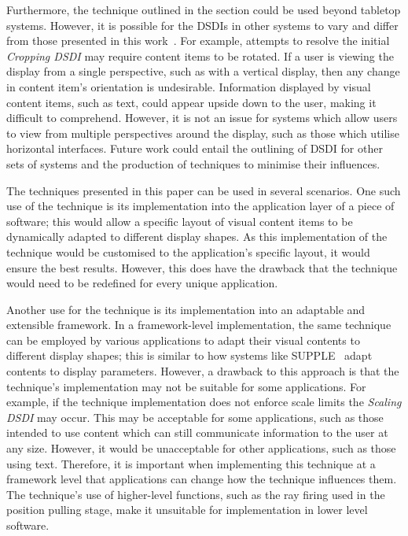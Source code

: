 \documentclass{bmcart}
\begin{document}
Furthermore, the technique outlined in the  section could be used beyond tabletop systems.
However, it is possible for the \acp{DSDI} in other systems to vary and differ from those presented in this work~\cite{Serrano2017}. 
For example, attempts to resolve the initial {\emph{Cropping \ac{DSDI}}} may require content items to be rotated.
If a user is viewing the display from a single perspective, such as with a vertical display, then any change in content item's orientation is undesirable.
Information displayed by visual content items, such as text, could appear upside down to the user, making it difficult to comprehend.
However, it is not an issue for systems which allow users to view from multiple perspectives around the display, such as those which utilise horizontal interfaces.
Future work could entail the outlining of \ac{DSDI} for other sets of systems and the production of techniques to minimise their influences.


The techniques presented in this paper can be used in several scenarios.
One such use of the technique is its implementation into the application layer of a piece of software; this would allow a specific layout of visual content items to be dynamically adapted to different display shapes.
As this implementation of the technique would be customised to the application's specific layout, it would ensure the best results.
However, this does have the drawback that the technique would need to be redefined for every unique application.

Another use for the technique is its implementation into an adaptable and extensible framework.
In a framework-level implementation, the same technique can be
employed by various applications to adapt their visual contents to different display shapes; this is similar to how systems like SUPPLE~\cite{Gajos2004} adapt contents to display parameters.
However, a drawback to this approach is that the technique's implementation may not be suitable for some applications.  
For example, if the technique implementation does not enforce scale limits the {\emph{Scaling \ac{DSDI}}} may occur.
This may be acceptable for some applications, such as those intended to use content which can still communicate information to the user at any size.
However, it would be unacceptable for other applications, such as those using text.
Therefore, it is important when implementing this technique at a framework level that applications can change how the technique influences them.
The technique's use of higher-level functions, such as the ray firing used in the position pulling stage, make it unsuitable for implementation in lower level software.
\end{document}
